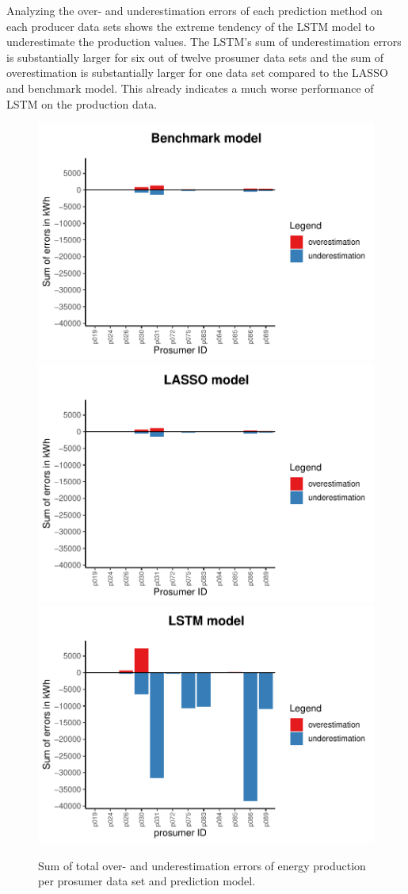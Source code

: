 Analyzing the over- and underestimation errors of each prediction method on each producer data sets shows the extreme tendency of the LSTM model to underestimate the production values. The LSTM's sum of underestimation errors is substantially larger for six out of twelve prosumer data sets and the sum of overestimation is substantially larger for one data set compared to the LASSO and benchmark model. This already indicates a much worse performance of LSTM on the production data.
%
\begin{figure}
    \centering
    \includegraphics[width=.5\textwidth]{thesis/graphs/evaluation/p_barplot_naive_overunderestimation.pdf}\\\vspace{.6cm}
    \includegraphics[width=.5\textwidth]{thesis/graphs/evaluation/p_barplot_LASSO_overunderestimation.pdf}\\\vspace{.6cm}
    \includegraphics[width=.5\textwidth]{thesis/graphs/evaluation/p_barplot_LSTM_overunderestimation.pdf}
    \caption[Sum of total over- and underestimation errors per prosumer data set]{Sum of total over- and underestimation errors of energy production per prosumer data set and prediction model. \quantnet\href{}{}}
    \label{Fig:overunderestimation}
\end{figure}
%

